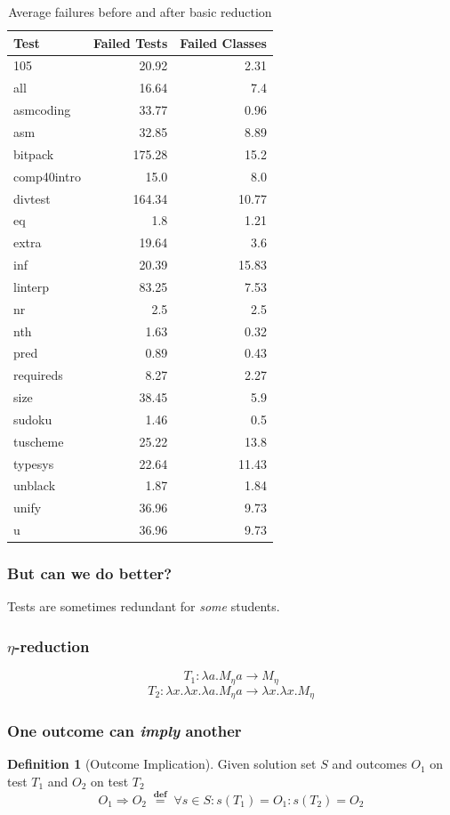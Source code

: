 \documentclass[svgnames]{beamer}
\newcommand\defined{\mathrel{\;\stackrel{\scriptscriptstyle\mathbf{def}}{=}\;}}
\theoremstyle{definition}
\newtheorem{defn}{Definition}
\begin{document}
\begin{frame}
\begin{table}[t]
\def\?{\phantom0}
\centering
\fontsize{8}{3}\selectfont
\begin{tabular}{ | l | r | r |}
\hline
Test & Failed Tests & Failed Classes \\
\hline
105 & 20.92 & 2.31 \\
all & 16.64 & 7.4 \\
asmcoding & 33.77 & 0.96 \\
asm & 32.85 & 8.89 \\
bitpack & 175.28 & 15.2 \\
comp40intro & 15.0 & 8.0 \\
divtest & 164.34 & 10.77 \\
eq & 1.8 & 1.21 \\
extra & 19.64 & 3.6 \\
inf & 20.39 & 15.83 \\
linterp & 83.25 & 7.53 \\
nr & 2.5 & 2.5 \\
nth & 1.63 & 0.32 \\
pred & 0.89 & 0.43 \\
requireds & 8.27 & 2.27 \\
size & 38.45 & 5.9 \\
sudoku & 1.46 & 0.5 \\
tuscheme & 25.22 & 13.8 \\
typesys & 22.64 & 11.43 \\
unblack & 1.87 & 1.84 \\
unify & 36.96 & 9.73 \\
u & 36.96 & 9.73 \\
\hline
\end{tabular}
\caption{Average failures before and after basic reduction}
\end{table}
\end{frame}

\begin{frame}
\frametitle{But can we do better?}
Tests are sometimes redundant for \emph{some} students.
\end{frame}

\begin{frame}
\frametitle{$\eta$-reduction}
$$T_1 : \lambda a.M_\eta a \longrightarrow M_\eta$$
$$T_2 : \lambda x.\lambda x.\lambda a.M_\eta a \longrightarrow \lambda x.\lambda x.M_\eta$$
\end{frame}

\begin{frame}
\frametitle{One outcome can \emph{imply} another}
\begin{defn}[Outcome Implication]
Given solution set $S$ and outcomes $O_1$ on test $T_1$ and $O_2$ on test $T_2$
$$O_1 \Rightarrow O_2 \defined \forall s \in S : s(T_1) = O_1 : s(T_2) = O_2$$
\end{defn}
\end{frame}
\end{document}
